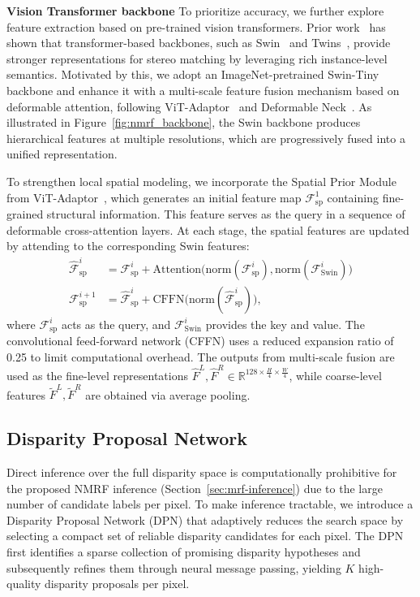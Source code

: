 \noindent\textbf{Vision Transformer backbone}
To prioritize accuracy, we further explore feature extraction based on pre-trained vision transformers. Prior work~\cite{zhang2024exploring} has shown that transformer-based backbones, such as Swin~\cite{liu2021Swin} and Twins~\cite{chu2021twins}, provide stronger representations for stereo matching by leveraging rich instance-level semantics.
Motivated by this, we adopt an ImageNet-pretrained Swin-Tiny backbone and enhance it with a multi-scale feature fusion mechanism based on deformable attention, following ViT-Adaptor~\cite{chen2022vision} and Deformable Neck~\cite{zhang2024exploring}.
As illustrated in Figure~\ref{fig:nmrf_backbone}, the Swin backbone produces hierarchical features at multiple resolutions, which are progressively fused into a unified representation.

To strengthen local spatial modeling, we incorporate the Spatial Prior Module from ViT-Adaptor~\cite{chen2022vision}, which generates an initial feature map $\mathcal{F}_{\mathrm{sp}}^1$ containing fine-grained structural information.
This feature serves as the query in a sequence of deformable cross-attention layers.
At each stage, the spatial features are updated by attending to the corresponding Swin features:
\begin{align}
	\hat{\mathcal{F}}_{\mathrm{sp}}^i &= \mathcal{F}_{\mathrm{sp}}^i + \mathrm{Attention}\big(\mathrm{norm}(\mathcal{F}_{\mathrm{sp}}^i), \mathrm{norm}(\mathcal{F}_{\mathrm{Swin}}^i)\big)\\
	\mathcal{F}_{\mathrm{sp}}^{i+1} &= \hat{\mathcal{F}}_{\mathrm{sp}}^i + \mathrm{CFFN}\big(\mathrm{norm}(\hat{\mathcal{F}}_{\mathrm{sp}}^i)\big),
\end{align}
where $\mathcal{F}_{\mathrm{sp}}^i$ acts as the query, and $\mathcal{F}_{\mathrm{Swin}}^i$ provides the key and value. 
The convolutional feed-forward network (CFFN) uses a reduced expansion ratio of 0.25 to limit computational overhead.
The outputs from multi-scale fusion are used as the fine-level representations $\hat{F}^L, \hat{F}^R \in \mathbb{R}^{128 \times \frac{H}{4} \times \frac{W}{4}}$, while coarse-level features $\tilde{F}^L, \tilde{F}^R$ are obtained via average pooling.

\subsection{Disparity Proposal Network}\label{sec:dpn}
Direct inference over the full disparity space is computationally prohibitive for the proposed NMRF inference (Section~\ref{sec:mrf-inference}) due to the large number of candidate labels per pixel. 
To make inference tractable, we introduce a Disparity Proposal Network (DPN) that adaptively reduces the search space by selecting a compact set of reliable disparity candidates for each pixel. 
The DPN first identifies a sparse collection of promising disparity hypotheses and subsequently refines them through neural message passing, yielding $K$ high-quality disparity proposals per pixel.

